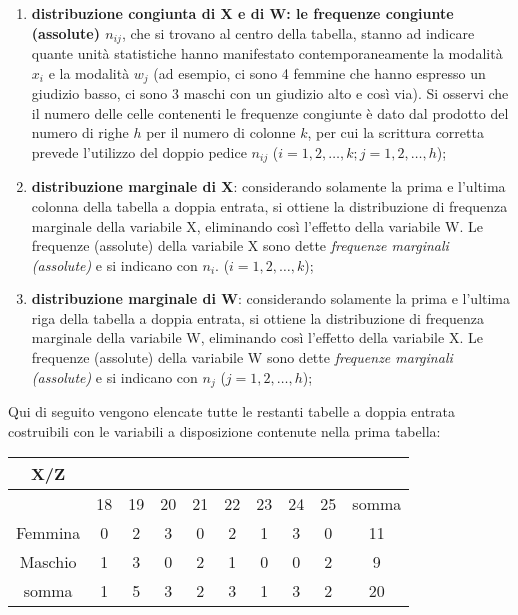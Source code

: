\begin{enumerate}
        \item \textbf{distribuzione congiunta di X e di W: le frequenze 
congiunte (assolute) $n_{ij}$}, che si trovano al centro della tabella, 
stanno ad indicare quante unità statistiche hanno manifestato 
contemporaneamente la modalità $x_i$ e la modalità $w_j$ (ad esempio, ci 
sono 4 femmine che hanno espresso un giudizio basso, ci sono 3 maschi con 
un giudizio alto e così via). Si osservi che il numero delle celle 
contenenti le frequenze congiunte è dato dal prodotto del numero di righe 
$h$ per il numero di colonne $k$, per cui la scrittura corretta prevede 
l'utilizzo del doppio pedice $n_{ij}$ ($i=1,2,\dots,k; j=1,2,\dots,h$);
        \item \textbf{distribuzione marginale di X}: considerando solamente 
la prima e l'ultima colonna della tabella a doppia entrata, si ottiene la 
distribuzione di frequenza marginale della variabile X, eliminando così 
l'effetto della variabile W. Le frequenze (assolute) della variabile X sono 
dette \emph{frequenze marginali (assolute)} e si indicano con $n_i$. 
($i=1,2,\dots,k$);
        \item\textbf{ distribuzione marginale di W}: considerando solamente 
la prima e l'ultima riga della tabella a doppia entrata, si ottiene la 
distribuzione di frequenza marginale della variabile W, eliminando così 
l'effetto della variabile X. Le frequenze (assolute) della variabile W sono 
dette \emph{frequenze marginali (assolute)} e si indicano con $n_j$ 
($j=1,2,\dots,h$);
\end{enumerate}
Qui di seguito vengono elencate tutte le restanti tabelle a doppia entrata 
costruibili con le variabili a disposizione contenute nella prima tabella:

\noindent
\begin{tabular}{|c|c|c|c|c|c|c|c|c|c|}
        \hline
X/Z&&&&&&&&&\\ 
\hline
        &18&    19&     20&     21&     22&     23&     24&     25&     
somma\\ 
        \hline
Femmina&        0&      2&      3&      0&      2       &1      &3      
&0      &11\\
\hline
Maschio&        1&      3&      0       &2      &1&     0&      0&      
2&      9\\
\hline
somma & 1&      5&      3&      2&      3&      1&      3       &2      
&20\\
\hline
\end{tabular}

